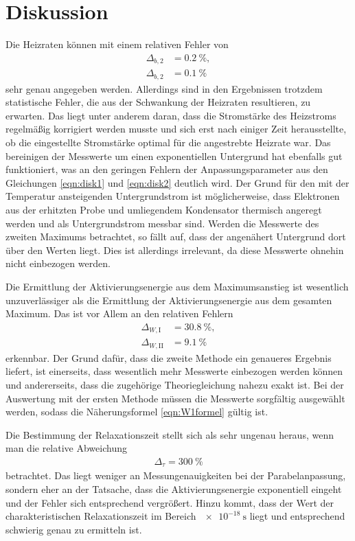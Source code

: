 \section{Diskussion}
\label{sec:Diskussion}

Die Heizraten können mit einem relativen Fehler von
\begin{align}
  \Delta_{b,2} &= \SI{0.2}{\percent}, \\
  \Delta_{b,2} &= \SI{0.1}{\percent}
\end{align}
sehr genau angegeben werden. Allerdings sind in den Ergebnissen trotzdem statistische Fehler,
die aus der Schwankung der Heizraten resultieren, zu erwarten. Das liegt unter anderem
daran, dass die Stromstärke des Heizstroms regelmäßig korrigiert werden musste und sich erst
nach einiger Zeit herausstellte, ob die eingestellte Stromstärke optimal für die angestrebte
Heizrate war. Das bereinigen der Messwerte um einen exponentiellen Untergrund hat ebenfalls gut funktioniert,
was an den geringen Fehlern der Anpassungsparameter aus den Gleichungen \eqref{eqn:disk1} und \eqref{eqn:disk2} deutlich
wird. Der Grund für den mit der Temperatur ansteigenden Untergrundstrom ist möglicherweise, dass
Elektronen aus der erhitzten Probe und umliegendem Kondensator thermisch angeregt werden und als
Untergrundstrom messbar sind. Werden die Messwerte des zweiten Maximums betrachtet, so fällt auf, dass der
angenähert Untergrund dort über den Werten liegt. Dies ist allerdings irrelevant, da diese Messwerte ohnehin
nicht einbezogen werden.

Die Ermittlung der Aktivierungsenergie aus dem Maximumsanstieg ist wesentlich
unzuverlässiger als die Ermittlung der Aktivierungsenergie aus dem gesamten Maximum. Das ist vor Allem an
den relativen Fehlern
\begin{align}
  \Delta_{W,\text{I}} &= \SI{30.8}{\percent}, \\
  \Delta_{W,\text{II}} &= \SI{9.1}{\percent}
\end{align}
erkennbar. Der Grund dafür, dass die zweite Methode ein genaueres Ergebnis liefert, ist einerseits, dass wesentlich
mehr Messwerte einbezogen werden können und andererseits, dass die zugehörige Theoriegleichung nahezu exakt ist.
Bei der Auswertung mit der ersten Methode müssen die Messwerte sorgfältig ausgewählt werden, sodass
die Näherungsformel \eqref{eqn:W1formel} gültig ist.

Die Bestimmung der Relaxationszeit stellt sich als sehr ungenau heraus, wenn man die relative Abweichung
\begin{align}
  \Delta_{\tau} = \SI{300}{\percent}
\end{align}
betrachtet. Das liegt weniger an Messungenauigkeiten bei der Parabelanpassung, sondern eher an der Tatsache, dass
die Aktivierungsenergie exponentiell eingeht und der Fehler sich entsprechend vergrößert. Hinzu kommt, dass
der Wert der charakteristischen Relaxationszeit im Bereich $\SI{e-18}{\second}$ liegt und entsprechend
schwierig genau zu ermitteln ist.

